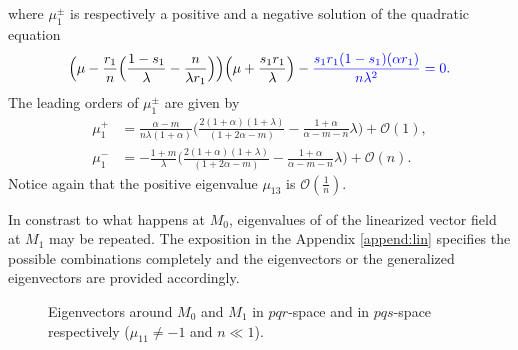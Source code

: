 \documentclass[a4paper,11pt]{article}
\def\blue{\color{blue}}
\def\BO{{\mathcal{O}}}
\theoremstyle{remark}
\begin{document}
\begin{itemize}
\begin{equation}
\end{equation}
where $\mu_1^\pm$ is respectively a positive and a negative solution of the quadratic equation
 $$ \Big(\mu - \frac{r_1}{n}\Big(\frac{1-s_1}{\lambda}-\frac{n}{\lambda r_1}\Big)\Big)\Big(\mu + \frac{s_1r_1}{\lambda}\Big) - %
{\blue \frac{s_1r_1(1-s_1)(\alpha r_1)}{n\lambda^2} = 0.}$$
The leading orders of $\mu_1^\pm$ are given by
\begin{align*}
\mu_1^+ &= \frac{\alpha-m}{n\lambda(1+\alpha)}\Big(\frac{2(1+\alpha)(1+\lambda)}{(1+2\alpha-m) } - \frac{1+\alpha}{\alpha-m-n}\lambda\Big) + \BO(1), \\
\mu_1^- &= -\frac{1+m}{\lambda}\Big(\frac{2(1+\alpha)(1+\lambda)}{(1+2\alpha-m) } - \frac{1+\alpha}{\alpha-m-n}\lambda\Big) + \BO(n).
\end{align*}
Notice again that the positive eigenvalue $\mu_{13}$ is $\mathcal{O}( \frac{1}{n})$.

{\blue In constrast to what happens at $M_0$, eigenvalues of of the linearized vector field at $M_1$ may} be repeated. The exposition in the Appendix \ref{append:lin} specifies the possible combinations completely and the eigenvectors or the generalized eigenvectors are provided accordingly.
\end{itemize}
\begin{figure}
 \centering
  \subfigure[$pqr$-space]{
  \psfrag{r}{\scriptsize$r$}%
  \texttt{[image: equilibriapqr.eps]}\label{fig:eq1}
  }
  \quad \quad
  \subfigure[$pqs$-space]{
  \psfrag{r}{\scriptsize$s-\frac{1+m}{1+\alpha}$}%
  \texttt{[image: equilibriapqs.eps]}\label{fig:eq2}
  }
  \caption{Eigenvectors around $M_0$ and $M_1$ in $pqr$-space and in $pqs$-space respectively ($\mu_{11}\ne-1$ and $n\ll1$). } \label{fig:equilibria}
\end{figure}
\end{document}

